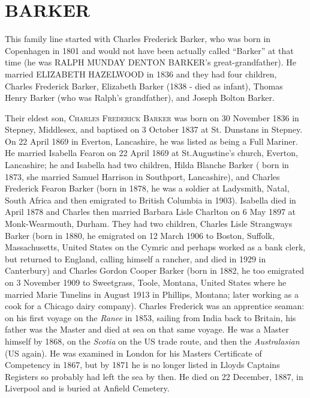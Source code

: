 \section{BARKER}

This family line started with Charles Frederick Barker, who was born in Copenhagen in 1801 and would not have been actually called ``Barker'' at that time (he was \uppercase{Ralph Munday Denton Barker}'s great-grandfather). He married  \uppercase{Elizabeth Hazelwood} in 1836 and they had four children,  Charles Frederick Barker, Elizabeth Barker (1838 - died as infant), Thomas Henry Barker (who was Ralph's grandfather), and Joseph Bolton Barker.

Their eldest son,  \textsc{Charles Frederick Barker} was born on 30 November 1836 in Stepney, Middlesex, and baptised on 3 October 1837 at St. Dunstans in Stepney. On 22 April 1869 in Everton, Lancashire, he was listed as being a Full Mariner. He married Isabella Fearon on 22 April 1869 at St.Augustine's church,	Everton, Lancashire; he and Isabella had two children, Hilda Blanche Barker ( born in 1873, she married Samuel Harrison in Southport, Lancashire), and Charles Frederick Fearon Barker (born in 1878, he was a soldier at Ladysmith, Natal, South Africa and then emigrated to British Columbia in 1903). Isabella died in April 1878 and Charles then married Barbara Lisle Charlton on 6 May 1897 at Monk-Wearmouth, Durham. They had two children, Charles Lisle Strangways Barker (born in 1880, he emigrated on 12 March 1906 to	Boston, Suffolk, Massachusetts, United States on the Cymric and perhaps worked as a bank clerk, but returned to England, calling himself a rancher, and died in 1929 in Canterbury) and Charles Gordon Cooper Barker (born in 1882, he too emigrated on 3 November 1909 to	Sweetgrass, Toole, Montana, United States where he married Marie Tunelins in August 1913 in Phillips, Montana; later working as a cook for a Chicago dairy company).
Charles Frederick was an apprentice seaman: on his first voyage on the \textit{Ranee} in 1853, sailing from India back to Britain, his father was the Master and died at sea on that same voyage. He was a Master himself by 1868, on the \textit{Scotia} on the US trade route, and then the \textit{Australasian} (US again). He was examined in London for his Masters Certificate of Competency in 1867, but by 1871 he is no longer listed in Lloyds Captains Registers so probably had left the sea by then. He died on 22 December, 1887,  in Liverpool and is buried at Anfield Cemetery.

